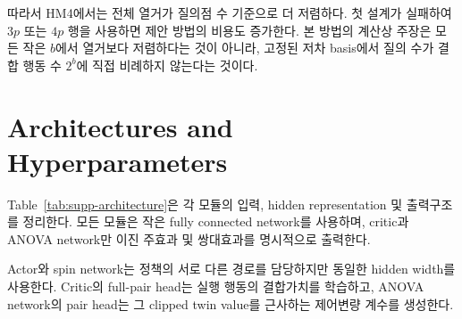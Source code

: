 \documentclass[10pt,journal]{IEEEtran}
\begin{document}
따라서 HM4에서는 전체 열거가 질의점 수 기준으로 더 저렴하다. 첫 설계가 실패하여 $3p$ 또는 $4p$ 행을 사용하면 제안 방법의 비용도 증가한다. 본 방법의 계산상 주장은 모든 작은 $b$에서 열거보다 저렴하다는 것이 아니라, 고정된 저차 basis에서 질의 수가 결합 행동 수 $2^b$에 직접 비례하지 않는다는 것이다.

\section{Architectures and Hyperparameters}
\label{sec:hyperparameters}

Table~\ref{tab:supp-architecture}은 각 모듈의 입력, hidden representation 및 출력구조를 정리한다. 모든 모듈은 작은 fully connected network를 사용하며, critic과 ANOVA network만 이진 주효과 및 쌍대효과를 명시적으로 출력한다.

\begin{table}[!t]
\centering
\caption{Network architecture used by the proposed method.}
\label{tab:supp-architecture}
\end{table}

Actor와 spin network는 정책의 서로 다른 경로를 담당하지만 동일한 hidden width를 사용한다. Critic의 full-pair head는 실행 행동의 결합가치를 학습하고, ANOVA network의 pair head는 그 clipped twin value를 근사하는 제어변량 계수를 생성한다.
\end{document}
